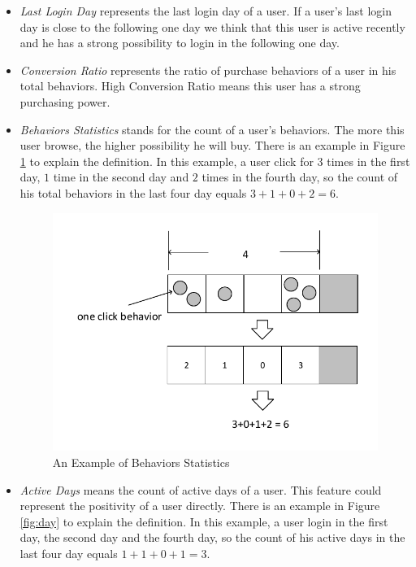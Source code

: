 \documentclass{llncs}
\begin{document}
\begin{itemize}
	\item \emph{Last Login Day} represents the last login day of a user.
	If a user's last login day is close to the following one day
	we think that this user is active recently
	and he has a strong possibility to login in the following one day.
	
	\item \emph{Conversion Ratio} represents the ratio of purchase behaviors of a user
	in his total behaviors. High Conversion Ratio means this user
	has a strong purchasing power.
	
	\item \emph{Behaviors Statistics} stands for the count of a user's behaviors.
	The more this user browse, the higher possibility he will buy.
	There is an example in Figure \ref{fig:num} to explain the definition.
	In this example, a user click for $3$ times in the first day, $1$ time in the second day and
	$2$ times in the fourth day, so the count of his total behaviors in the last four day equals
	$3 + 1 + 0 + 2 = 6$.
	
	\begin{figure}[htbp]
		\centering
		\includegraphics[scale=0.6]{images/active_cnt.pdf}
		\caption{An Example of Behaviors Statistics}
		\label{fig:num}
	\end{figure}
	
	\item \emph{Active Days} means the count of active days of a user.
	This feature could represent the positivity of a user directly.
	There is an example in Figure \ref{fig:day} to explain the definition.
	In this example, a user login in the first day, the second day and
	the fourth day, so the count of his active days in the last four day equals
	$1 + 1 + 0 + 1 = 3$.
	

\end{itemize}
\end{document}
